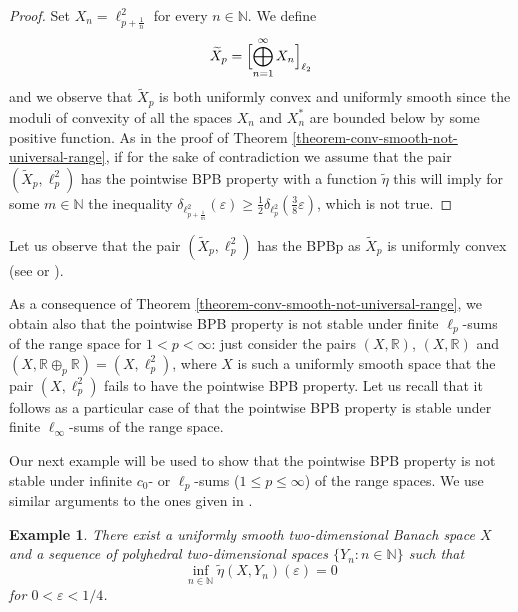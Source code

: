 \documentclass[a4paper,10pt]{amsart}
\theoremstyle{plain}
\theoremstyle{definition}
\newtheorem{example}[theorem]{Example}
\newcommand{\R}{\mathbb{R}}
\newcommand{\N}{\mathbb{N}}
\newcommand{\eps}{\varepsilon}
\renewcommand{\geq}{\geqslant}
\renewcommand{\leq}{\leqslant}
\begin{document}
\begin{proof}
Set $X_n=\ell_{p+\frac{1}{n}}^2$ for every $n\in \N$. We define
$$
\widetilde{X}_p=\Bigl[\bigoplus_{n=1}^\infty X_n\Bigr]_{\ell_2}
$$
and we observe that $\widetilde{X}_p$ is both uniformly convex and uniformly smooth since the moduli of convexity of all the spaces $X_n$ and $X_n^*$ are bounded below by some positive function. As in the proof of Theorem \ref{theorem-conv-smooth-not-universal-range}, if  for the sake of contradiction we assume that the pair $(\widetilde{X}_p,\ell_p^2)$ has the pointwise BPB property with a function $\tilde\eta$ this will imply for some $m \in \N$ the inequality  $\delta_{\ell_{p+\frac{1}{m}}^2}(\eps)\geq \frac{1}{2}\delta_{\ell_p^2}\left(\frac{3}{8}\eps\right)$, which is not true.
\end{proof}

Let us observe that the pair $(\widetilde{X}_p,\ell_p^2)$ has the BPBp as $\widetilde{X}_p$ is uniformly convex (see \cite[Theorem 2.2]{ABGM} or \cite[Theorem 3.1]{KL}).

As a consequence of Theorem  \ref{theorem-conv-smooth-not-universal-range}, we obtain also that the pointwise BPB property is not stable under finite $\ell_p$-sums of the range space for $1 < p< \infty$: just consider the pairs $(X, \R)$, $(X, \R)$ and $(X, \R \oplus_p \R) = (X, \ell_p^2)$, where $X$ is such a uniformly smooth space that  the pair $(X, \ell_p^2)$ fails to have the pointwise BPB property.  Let us recall that it follows as a particular case of \cite[Proposition 2.9]{DKL} that the pointwise BPB property is stable under finite $\ell_\infty$-sums of the range space.


Our next example will be used to show that the pointwise BPB property is not stable under infinite $c_0$- or $\ell_p$-sums ($1\leq  p \leq \infty$) of the range spaces. We use similar arguments to the ones given in \cite[Example 4.1]{ACKLM}.

\begin{example}\label{example-pointwise BPB property-range}
{\slshape There exist a uniformly smooth two-dimensional Banach space $X$ and a sequence of polyhedral two-dimensional spaces $\{Y_n\colon n\in \N\}$ such that
\begin{equation*}
	\inf_{n \in \N} \tilde\eta(X, Y_n)(\eps) = 0
\end{equation*}
for $0<\eps<1/4$.}
\end{example}
\end{document}
